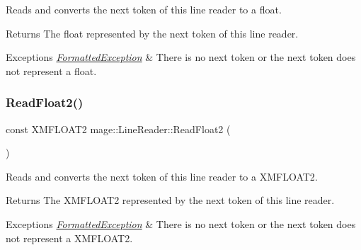 Reads and converts the next token of this line reader to a {\ttfamily float}.

\begin{DoxyReturn}{Returns}
The {\ttfamily float} represented by the next token of this line reader. 
\end{DoxyReturn}

\begin{DoxyExceptions}{Exceptions}
{\em \hyperlink{structmage_1_1_formatted_exception}{Formatted\+Exception}} & There is no next token or the next token does not represent a {\ttfamily float}. \\
\hline
\end{DoxyExceptions}
\hypertarget{classmage_1_1_line_reader_ae33effd33fad465616e3acf8acdc408f}{}\label{classmage_1_1_line_reader_ae33effd33fad465616e3acf8acdc408f} 
\subsubsection{\texorpdfstring{Read\+Float2()}{ReadFloat2()}}
{\footnotesize\ttfamily const X\+M\+F\+L\+O\+A\+T2 mage\+::\+Line\+Reader\+::\+Read\+Float2 (\begin{DoxyParamCaption}{ }\end{DoxyParamCaption})\hspace{0.3cm}{\ttfamily [protected]}}

Reads and converts the next token of this line reader to a {\ttfamily X\+M\+F\+L\+O\+A\+T2}.

\begin{DoxyReturn}{Returns}
The {\ttfamily X\+M\+F\+L\+O\+A\+T2} represented by the next token of this line reader. 
\end{DoxyReturn}

\begin{DoxyExceptions}{Exceptions}
{\em \hyperlink{structmage_1_1_formatted_exception}{Formatted\+Exception}} & There is no next token or the next token does not represent a {\ttfamily X\+M\+F\+L\+O\+A\+T2}. \\
\hline
\end{DoxyExceptions}
\hypertarget{classmage_1_1_line_reader_a7a605a7c2402051f1ca4fda1e543fc28}{}\label{classmage_1_1_line_reader_a7a605a7c2402051f1ca4fda1e543fc28} 
